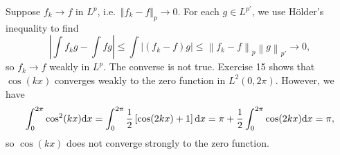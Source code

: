 \begin{exercise}{8.16}
  Suppose $f_k \rightarrow f$ in $L^p$,
  i.e.\ $\Vert f_k - f \Vert_p \rightarrow 0$.
  For each $g \in L^{p'}$, we use H\"{o}lder's inequality to find
  \[
    \left| \int f_k g - \int f g \right|
    \le \int \left| (f_k - f) g \right|
    \le \left\| f_k - f \right\|_p \left\| g \right\|_{p'}
    \rightarrow 0,
  \]
  so $f_k \rightarrow f$ weakly in $L^p$.
  The converse is not true.
  Exercise 15 shows that $\cos(kx)$
  converges weakly to the zero function in $L^2(0, 2\pi)$.
  However, we have
  \[
    \int_0^{2\pi} \cos^2(kx) \mathrm{d} x
    = \int_0^{2\pi} \frac{1}{2} \left[ \cos(2kx) + 1 \right] \mathrm{d} x
    = \pi + \frac{1}{2} \int_0^{2\pi} \cos(2kx) \mathrm{d} x
    = \pi,
  \]
  so $\cos(kx)$ does not converge strongly to the zero function.
\end{exercise}

